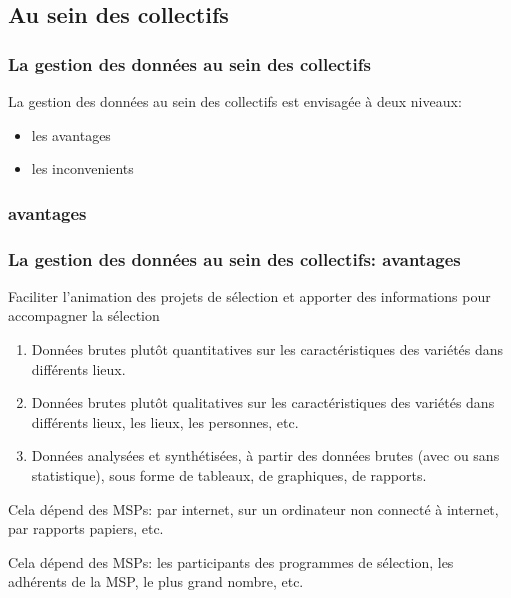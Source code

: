 \subsection{Au sein des collectifs}  

\begin{frame}
\frametitle{La gestion des données au sein des collectifs}

La gestion des données au sein des collectifs est envisagée à deux niveaux:

\begin{itemize}
\item les avantages
\item les inconvenients
\end{itemize}

\end{frame}

\subsubsection{avantages}

\begin{frame} 
\frametitle{La gestion des données au sein des collectifs: avantages}

 Faciliter l'animation des projets de sélection et apporter des  informations pour accompagner la sélection 

\vfil

\begin{enumerate}
\item Données brutes plutôt quantitatives sur les caractéristiques des variétés dans différents lieux. 
\item Données brutes plutôt qualitatives sur les caractéristiques des variétés dans différents lieux, les lieux, les personnes, etc.
\item Données analysées et synthétisées, à partir des données brutes (avec ou sans statistique), sous forme de tableaux, de graphiques, de rapports.
\end{enumerate}

\vfill

Cela dépend des MSPs: par internet, sur un ordinateur non connecté à internet, par rapports papiers, etc.

\vfill

Cela dépend des MSPs: les participants des programmes de sélection, les adhérents de la MSP, le plus grand nombre, etc.


\end{frame}


